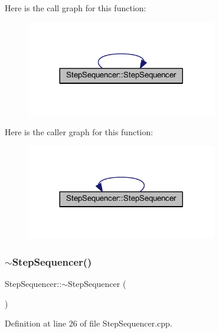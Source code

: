 Here is the call graph for this function\+:
\nopagebreak
\begin{figure}[H]
\begin{center}
\leavevmode
\includegraphics[width=236pt]{dc/d87/class_step_sequencer_a552647854b6f7c5d653432774c357f3e_cgraph}
\end{center}
\end{figure}
Here is the caller graph for this function\+:
\nopagebreak
\begin{figure}[H]
\begin{center}
\leavevmode
\includegraphics[width=236pt]{dc/d87/class_step_sequencer_a552647854b6f7c5d653432774c357f3e_icgraph}
\end{center}
\end{figure}
\mbox{\label{class_step_sequencer_a82bc995a1e19baecda84708de8fa265f}} 
\subsubsection{\texorpdfstring{$\sim$\+Step\+Sequencer()}{~StepSequencer()}}
{\footnotesize\ttfamily Step\+Sequencer\+::$\sim$\+Step\+Sequencer (\begin{DoxyParamCaption}{ }\end{DoxyParamCaption})}



Definition at line 26 of file Step\+Sequencer.\+cpp.



